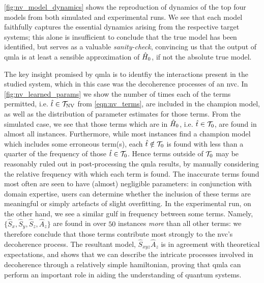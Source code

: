 \cref{fig:nv_model_dynamics} shows the reproduction of dynamics of the top four models
    from both simulated and experimental \glspl{run}. 
We see that each model faithfully captures the essential dynamics arising from the respective target systems;
    this alone is insufficient to conclude that the \gls{true model} has been identified, 
    but serves as a valuable \emph{sanity-check}, convincing us that the output of \gls{qmla} is at least a sensible 
    approximation of $\hat{H}_0$, if not the absolute \gls{true model}.
\par 

The key insight promised by \gls{qmla} is to identfiy the interactions present in the studied system, 
    which in this case was the decoherence processes of an \gls{nvc}.
In \cref{fig:nv_learned_params} we show the number of times each of the terms permitted, 
    i.e. $\hat{t} \in \mathcal{T}_{\textrm{NV}}$ from \cref{eqn:nv_terms},
    are included in the \gls{champion model},
    as well as the distribution of parameter estimates for those terms. 
From the simulated case, we see that those terms which are in $\hat{H}_0$, i.e. $\hat{t} \in \mathcal{T}_0$, are found in almost all instances.
Furthermore, while most instances find a \gls{champion model} which includes some erroneous term(s), 
    each $\hat{t} \notin \mathcal{T}_0$ is found with less than a quarter of the frequency of those $\hat{t} \in \mathcal{T}_0$.
Hence terms outside of $\mathcal{T}_0$ may be reasonably ruled out in post-processing the \gls{qmla} results, 
    by manually considering the relative frequency with which each term is found. 
The inaccurate terms found most often are seen to have (almost) negligible parameters:
    in conjunction with domain expertise, users can determine whether the inclusion of these terms 
    are meaningful or simply artefacts of slight overfitting.
In the experimental \gls{run}, on the other hand, we see a similar gulf in frequency between some terms.
Namely, $\{ \hat{S}_x, \hat{S}_y, \hat{S}_z, \hat{A}_z \}$ are found in over $50$ \glspl{instance} \emph{more} than all other terms:
    we therefore conclude that those terms contribute most strongly to the \gls{nvc}'s decoherence process.
The resultant model, $\hat{S}_{xyz}\hat{A}_{z}$ is in agreement with theoretical expectations, 
    and shows that we can describe the intricate processes involved in decoherence through a relatively simple 
    \gls{hamiltonian}, proving that \gls{qmla} can perform an important role in aiding the understanding of quantum systems.  
\par 

